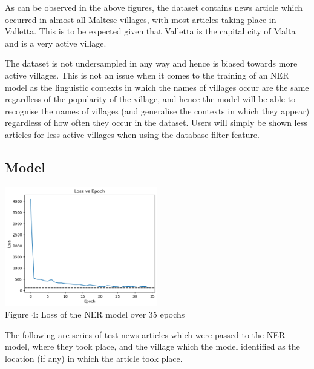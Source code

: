 \documentclass[a4paper, oneside, 11pt]{article}
\begin{document}
\begin{multicols*}{2}
  As can be observed in the above figures, the dataset contains news article which occurred in almost all Maltese villages, with most articles taking place in Valletta. This is to be expected given that Valletta is the capital city of Malta and is a very active village.

  The dataset is not undersampled in any way and hence is biased towards more active villages. This is not an issue when it comes to the training of an NER model as the linguistic contexts in which the names of villages occur are the same regardless of the popularity of the village, and hence the model will be able to recognise the names of villages (and generalise the contexts in which they appear) regardless of how often they occur in the dataset. Users will simply be shown less articles for less active villages when using the database filter feature.


  \subsection{Model}
  \begin{center}
    \includegraphics[width=0.5\textwidth]{./figures/nerloss.png} \\
    Figure 4: Loss of the NER model over 35 epochs
  \end{center}

  The following are series of test news articles which were passed to the NER model, where they took place, and the village which the model identified as the location (if any) in which the article took place.


\end{multicols*}
\end{document}
